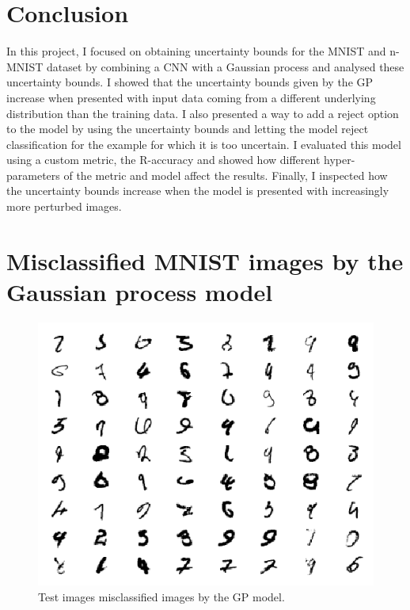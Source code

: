 \documentclass{article}
\begin{document}
\section{Conclusion}
In this project, I focused on obtaining uncertainty bounds for the MNIST and n-MNIST dataset by combining a CNN with a Gaussian process and analysed these uncertainty bounds. I showed that the uncertainty bounds given by the GP increase when presented with input data coming from a different underlying distribution than the training data. I also presented a way to add a reject option to the model by using the uncertainty bounds and letting the model reject classification for the example for which it is too uncertain. I evaluated this model using a custom metric, the R-accuracy and showed how different hyper-parameters of the metric and model affect the results. Finally, I inspected how the uncertainty bounds increase when the model is presented with increasingly more perturbed images.

\small




\newpage
\appendix 
\section{Misclassified MNIST images by the Gaussian process model}
\label{appendix/mnist_error}

\begin{figure}[h]
	\centering
	\includegraphics[scale=1.1]{incorrect_mnist}
	\caption{Test images misclassified images by the GP model.}
	\label{fig/incorrect_mnist}
\end{figure}
\end{document}
